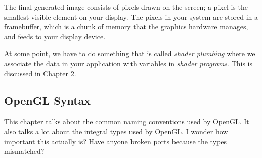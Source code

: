 \documentclass[a4paper,10pt]{book}
\begin{document}
The final generated image consists of pixels drawn on the screen;
a pixel is the smallest visible element on your display.
The pixels in your system are stored in a framebuffer, which is a chunk of memory that the graphics hardware manages, and feeds to your display device.

At some point, we have to do something that is called \textit{shader plumbing} where we associate the data in your application with variables in \textit{shader programs}.
This is discussed in Chapter 2.

\subsection{OpenGL Syntax}

This chapter talks about the common naming conventions used by OpenGL.
It also talks a lot about the integral types used by OpenGL.
I wonder how important this actually is?
Have anyone broken ports because the types mismatched?
\end{document}
